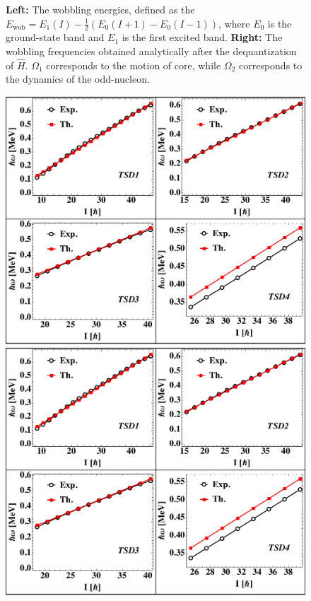 \documentclass[final]{beamer}
\newlength{\colwidth}
\begin{document}
\begin{frame}[t]
\begin{columns}[t]
\begin{column}{\colwidth}
\begin{figure}
\begin{minipage}{.5\textwidth}
\end{minipage}
\caption{\textbf{Left:} The wobbling energies, defined as the $E_\text{wob}=E_1(I)-\frac{1}{2}(E_0(I+1)-E_0(I-1))$, where $E_0$ is the ground-state band and $E_1$ is the first excited band. \textbf{Right:} The wobbling frequencies obtained analytically after the dequantization of $\hat{H}$. $\Omega_1$ corresponds to the motion of core, while $\Omega_2$ corresponds to the dynamics of the odd-nucleon.}
    \label{wobb-energies}
\end{figure}
\begin{figure}
\centering
\begin{minipage}{.7\textwidth}
  \centering
  \includegraphics[scale=1.2]{images/rotFreqs.pdf}
\end{minipage}%
\begin{minipage}{.3\textwidth}
  \centering
 \includegraphics[scale=0.5]{images/rotFreqs.pdf}

\end{minipage}
\end{figure}
\end{column}
\end{columns}
\end{frame}
\end{document}
